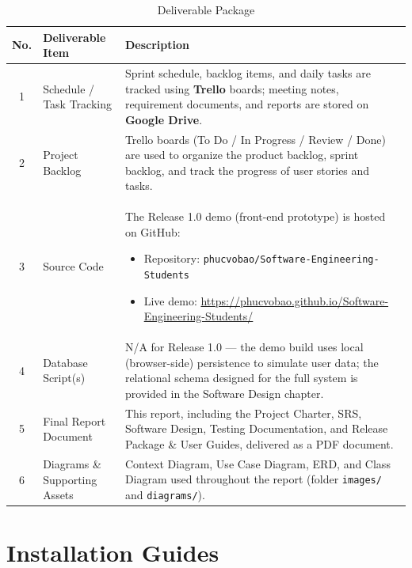 \begin{table}[H]
\centering
\caption{Deliverable Package}
\label{tab:deliverable}
\renewcommand{\arraystretch}{1.4}
\begin{tabularx}{\textwidth}{|c|l|X|}
\hline
\rowcolor{tableheader}
\textbf{No.} & \textbf{Deliverable Item} & \textbf{Description} \\
\hline

1 &
Schedule / Task Tracking &
Sprint schedule, backlog items, and daily tasks are tracked using \textbf{Trello} boards; meeting notes, requirement documents, and reports are stored on \textbf{Google Drive}.
\\
\hline

2 &
Project Backlog &
Trello boards (To Do / In Progress / Review / Done) are used to organize the product backlog, sprint backlog, and track the progress of user stories and tasks.
\\
\hline

3 &
Source Code &
The Release 1.0 demo (front-end prototype) is hosted on GitHub:
\begin{itemize}[nosep,leftmargin=1.2em]
    \item Repository: \texttt{phucvobao/Software-Engineering-Students}
    \item Live demo: \url{https://phucvobao.github.io/Software-Engineering-Students/}
\end{itemize}
\\
\hline

4 &
Database Script(s) &
N/A for Release 1.0 — the demo build uses local (browser-side) persistence to simulate user data; the relational schema designed for the full system is provided in the Software Design chapter.
\\
\hline

5 &
Final Report Document &
This report, including the Project Charter, SRS, Software Design, Testing Documentation, and Release Package \& User Guides, delivered as a PDF document.
\\
\hline

6 &
Diagrams \& Supporting Assets &
Context Diagram, Use Case Diagram, ERD, and Class Diagram used throughout the report (folder \texttt{images/} and \texttt{diagrams/}).
\\
\hline

\end{tabularx}
\end{table}

\section{Installation Guides}

